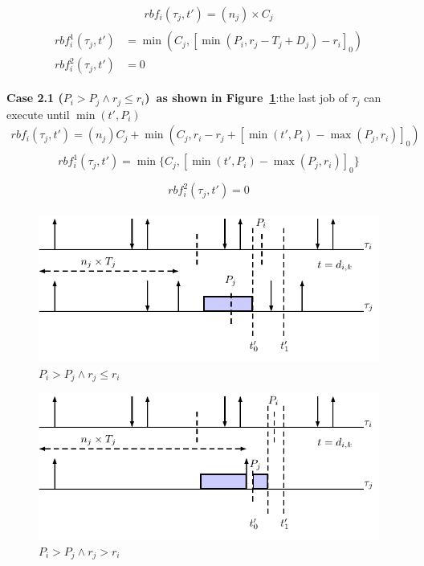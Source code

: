 \documentclass[12pt,conference,onecolumn]{IEEEtran}
\newcommand{\my}[1]{{\color{blue}{#1}}}
\begin{document}
	\begin{align*}
		rbf_i(\tau_j,t')=(n_j)\times C_j
	\end{align*}
\begin{align*}
\begin{split}
rbf_{i}^1(\tau_j,t')&=\min(C_j, [\min(P_i,r_j-T_j+D_j)-r_i]_0)\\
rbf_{i}^2(\tau_j,t')&=0
\end{split}
\end{align*}



\textbf{Case 2.1 ($P_i>P_j\wedge r_j\leq r_i$)~as shown in  Figure~\ref{fig:case5}}:the last job of $\tau_j$ can execute until $\min(t',P_i)$
	\begin{align*}
		rbf_i(\tau_j,t')=(n_j) C_j+\min\left(C_j,r_i-r_j+[\min(t',P_i)-\max(P_j,r_i)]_0\right)
	\end{align*}
	\begin{align*}
\begin{split}
rbf_{i}^1(\tau_j,t')=\min\{C_j,[\min(t',P_i)-\max(P_j,r_i)]_0\}
\end{split}
\end{align*}
\begin{align*}
\begin{split}
rbf_{i}^2(\tau_j,t')=0
\end{split}
\end{align*}

\begin{figure}[h!]
 \centering
\includegraphics[scale=1]{Figure/C4}  
\caption{$P_i>P_j\wedge r_j\leq r_i$}
  \label{fig:case5}
\end{figure}

\begin{figure}[h!]
 \centering
\includegraphics[scale=1]{Figure/C41}  
\caption{$P_i>P_j\wedge r_j> r_i $}
  \label{fig:case6}
\end{figure}
\end{document}
